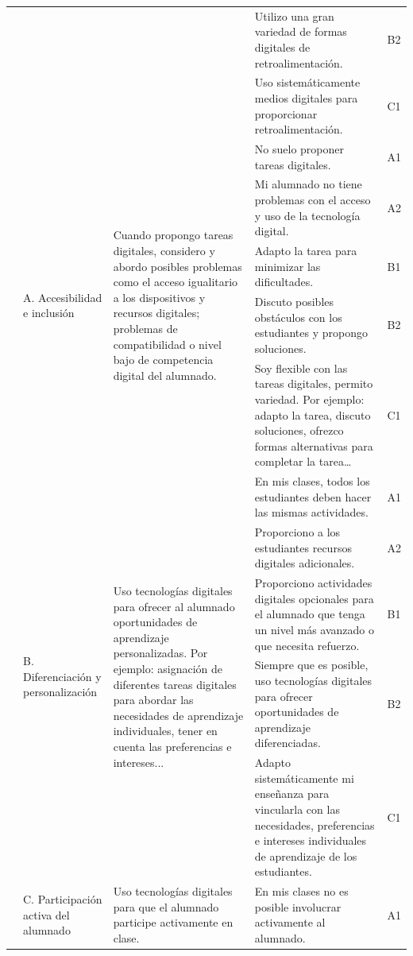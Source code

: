 \documentclass[spanish]{textolivre}
\begin{document}
\begin{small}
\begin{longtable}{
    >{\raggedright\arraybackslash}p{}
    p{}
    p{}
    p{}
    p{}
    }
\\
& & & Utilizo una gran variedad de formas digitales de retroalimentación. & B2
\\
& & & Uso sistemáticamente medios digitales para proporcionar retroalimentación. & C1
\\
\midrule
\multirow{15}{=}{5. Empoderar a los estudiantes} & \multirow{5}{=}{A. Accesibilidad e inclusión} & \multirow{5}{=}{Cuando propongo tareas digitales, considero y abordo posibles problemas como el acceso igualitario a los dispositivos y recursos digitales; problemas de compatibilidad o nivel bajo de competencia digital del alumnado.} & No suelo proponer tareas digitales. & A1
\\
& & & Mi alumnado no tiene problemas con el acceso y uso de la tecnología digital. & A2
\\
& & & Adapto la tarea para minimizar las dificultades. & B1
\\
& & & Discuto posibles obstáculos con los estudiantes y propongo soluciones. & B2
\\
& & & Soy flexible con las tareas digitales, permito variedad. Por ejemplo: adapto la tarea, discuto soluciones, ofrezco formas alternativas para completar la tarea… & C1
\\
\cmidrule{2-5}
& \multirow{5}{=}{B. Diferenciación y personalización} & \multirow{5}{=}{Uso tecnologías digitales para ofrecer al alumnado oportunidades de aprendizaje personalizadas. Por ejemplo: asignación de diferentes tareas digitales para abordar las necesidades de aprendizaje individuales, tener en cuenta las preferencias e intereses...} & En mis clases, todos los estudiantes deben hacer las mismas actividades. & A1
\\
& & & Proporciono a los estudiantes recursos digitales adicionales. & A2
\\
& & & Proporciono actividades digitales opcionales para el alumnado que tenga un nivel más avanzado o que necesita refuerzo. & B1
\\
& & & Siempre que es posible, uso tecnologías digitales para ofrecer oportunidades de aprendizaje diferenciadas. & B2
\\
& & & Adapto sistemáticamente mi enseñanza para vincularla con las necesidades, preferencias e intereses individuales de aprendizaje de los estudiantes. & C1
\\
\cmidrule{2-5}
& \multirow{5}{=}{C. Participación activa del alumnado} & \multirow{5}{=}{Uso tecnologías digitales para que el alumnado participe activamente en clase.} & En mis clases no es posible involucrar activamente al alumnado. & A1

\end{longtable}
\end{small}
\end{document}
